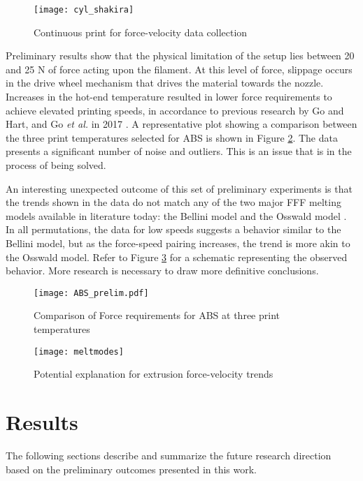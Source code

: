 \documentclass[main.tex]{subfiles}
\begin{document}
\begin{figure}[!htbp]
	\center
	\texttt{[image: cyl\_shakira]}
	\caption{Continuous print for force-velocity data collection} \label{fig:cyl}
\end{figure}

Preliminary results show that the physical limitation of the setup lies between 20 and 25 N of force acting upon the filament. At this level of force, slippage occurs in the drive wheel mechanism that drives the material towards the nozzle.  Increases in the hot-end temperature resulted in lower force requirements to achieve elevated printing speeds, in accordance to previous research by Go and Hart, and Go \emph{et al.} in 2017 \cite{Go2017a, Go2017}. A representative plot showing a comparison between the three print temperatures selected for ABS is shown in Figure \ref{fig:absprelim}. The data presents a significant number of noise and outliers. This is an issue that is in the process of being solved.

An interesting unexpected outcome of this set of preliminary experiments is that the trends shown in the data do not match any of the two major FFF melting models available in literature today: the Bellini model and the Osswald model \cite{Bellini2004, OsswaldMelting18}. In all permutations, the data for low speeds suggests a behavior similar to the Bellini model, but as the force-speed pairing increases, the trend is more akin to the Osswald model. Refer to Figure \ref{fig:meltmodes} for a schematic representing the observed behavior. More research is necessary to draw more definitive conclusions.

\begin{figure}[!htbp]
	\center
	\texttt{[image: ABS\_prelim.pdf]}
	\caption{Comparison of Force requirements for ABS at three print temperatures} \label{fig:absprelim}
\end{figure}

\begin{figure}[!htbp]
	\center
	\texttt{[image: meltmodes]}
	\caption{Potential explanation for extrusion force-velocity trends} \label{fig:meltmodes}
\end{figure}

\section{Results} \label{sec:ml_res}

The following sections describe and summarize the future research direction based on the preliminary outcomes presented in this work. 
\end{document}
